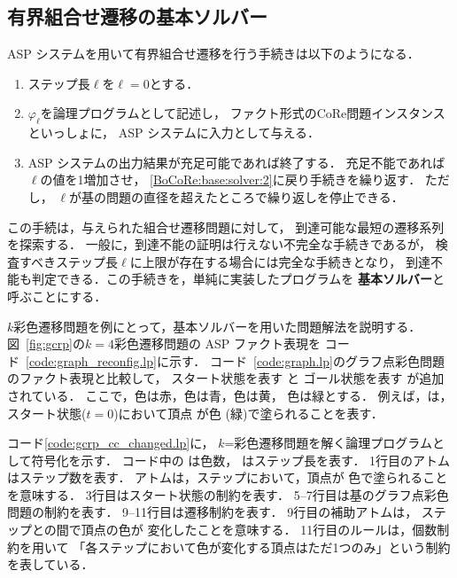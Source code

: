 \subsection{有界組合せ遷移の基本ソルバー} \label{sec:based_solver}

ASP システムを用いて有界組合せ遷移を行う手続きは以下のようになる．
\begin{enumerate}
\item ステップ長$\ell$を$\ell=0$とする．
\item \label{BoCoRe:base:solver:2}
  $\varphi_\ell$を論理プログラムとして記述し，
  ファクト形式のCoRe問題インスタンスといっしょに，
  ASP システムに入力として与える．
\item ASP システムの出力結果が充足可能であれば終了する．
  充足不能であれば$\ell$の値を1増加させ，
  \ref{BoCoRe:base:solver:2}に戻り手続きを繰り返す．
  ただし，
  $\ell$が基の問題の直径を超えたところで繰り返しを停止できる．
\end{enumerate}
この手続は，与えられた組合せ遷移問題に対して，
到達可能な最短の遷移系列を探索する．
一般に，到達不能の証明は行えない不完全な手続きであるが，
検査すべきステップ長$\ell$に上限が存在する場合には完全な手続きとなり，
到達不能も判定できる．この手続きを，単純に実装したプログラムを
\textbf{基本ソルバー}と呼ぶことにする．



$k$彩色遷移問題を例にとって，基本ソルバーを用いた問題解法を説明する．
図~\ref{fig:gcrp}の$k=4$彩色遷移問題の ASP ファクト表現を
コード~\ref{code:graph_reconfig.lp}に示す．
コード~\ref{code:graph.lp}のグラフ点彩色問題のファクト表現と比較して，
スタート状態を表す
と
ゴール状態を表す
が追加されている．
ここで，色は赤，色は青，色は黄，
色は緑とする．
例えば，は，スタート状態($t=0$)において頂点
が色 (緑)で塗られることを表す．

コード\ref{code:gcrp_cc_changed.lp}に，
$k$=彩色遷移問題を解く論理プログラムとして符号化を示す．
コード中の は色数， はステップ長を表す．
1行目のアトムはステップ数を表す．
アトムは，ステップにおいて，頂点が
色で塗られることを意味する．
3行目はスタート状態の制約を表す．
5--7行目は基のグラフ点彩色問題の制約を表す．
9--11行目は遷移制約を表す．
9行目の補助アトムは，
ステップとの間で頂点の色が
変化したことを意味する．
11行目のルールは，個数制約を用いて
「各ステップにおいて色が変化する頂点はただ1つのみ」という制約
を表している．

